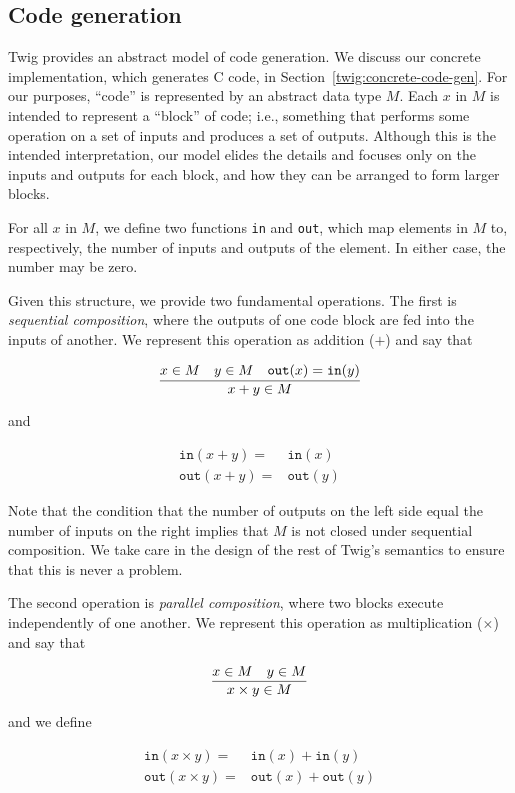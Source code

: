 
\subsection{Code generation}
\label{twig:code-gen}

Twig provides an abstract model of code generation. We discuss our concrete
implementation, which generates C code, in
Section~\ref{twig:concrete-code-gen}. For our purposes, ``code'' is
represented by an abstract data type $M$. Each $x$ in $M$ is intended to
represent a ``block'' of code; i.e., something that performs some operation on
a set of inputs and produces a set of outputs. Although this is the intended
interpretation, our model elides the details and focuses only on the inputs
and outputs for each block, and how they can be arranged to form larger
blocks.

For all $x$ in $M$, we define two functions \texttt{in} and \texttt{out},
which map elements in $M$ to, respectively, the number of inputs and outputs
of the element. In either case, the number may be zero.

Given this structure, we provide two fundamental operations. The first is
\emph{sequential composition}, where the outputs of one code block are fed
into the inputs of another. We represent this operation as addition ($+$) and
say that

\[
\infer
{x+y \in M}
{x \in M \quad y \in M \quad \mathtt{out}(x) = \mathtt{in}(y)}
\]

and

\begin{eqnarray*}
\mathtt{in} (x+y) =& \mathtt{in}(x)\\
\mathtt{out}(x+y) =& \mathtt{out}(y)
\end{eqnarray*}

Note that the condition that the number of outputs on the left side equal the
number of inputs on the right implies that $M$ is not closed under sequential
composition. We take care in the design of the rest of Twig's semantics to
ensure that this is never a problem.

The second operation is \emph{parallel composition}, where two blocks execute
independently of one another. We represent this operation as multiplication
($\times$) and say that

\[
\infer
{x \times y \in M}
{x \in M \quad y \in M}
\]

and we define

\begin{eqnarray*}
\mathtt{in} (x \times y) =& \mathtt{in}(x)  + \mathtt{in}(y)\\
\mathtt{out}(x \times y) =& \mathtt{out}(x) + \mathtt{out}(y)
\end{eqnarray*}

